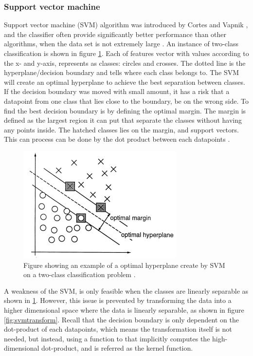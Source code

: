 \documentclass[USenglish]{ifimaster}  %
\begin{document}
\subsubsection{Support vector machine}
Support vector machine (SVM) algorithm was introduced by Cortes and Vapnik \cite{Cortes1995}, and the  classifier often provide significantly better performance than other algorithms, when the data set is not extremely large \cite{Marsland:2009:MLA:1571643}. An instance of two-class classification is shown in figure \ref{fig:SVM}. Each of features vector with values according to the x- and y-axis, represents as classes: circles and crosses. The dotted line is the hyperplane/decision boundary and tells where each class belongs to. The SVM will create an optimal hyperplane to achieve the best separation between classes. If the decision boundary was moved with small amount, it has a risk that a datapoint from one class that lies close to the boundary, be on the wrong side. To find the best decision boundary is by defining the optimal margin. The margin is defined as the largest region it can put that separate the classes without having any points inside. The hatched classes lies on the margin, and support vectors. This can process can be done by the dot product between each datapoints \cite{Cortes1995}.
	
\begin{figure}[h]
	\centering
	\includegraphics{Figures/SVM.PNG}
	\caption{Figure showing an example of a optimal hyperplane create by SVM on a two-class classification problem  \cite{Cortes1995}.}
	\label{fig:SVM}
\end{figure}
\FloatBarrier

A weakness of the SVM, is only feasible when the classes are linearly separable as shown in \ref{fig:SVM}. However, this issue is prevented by transforming the data into a higher dimensional space where the data is linearly separable, as shown in figure \ref{fig:svmtransform}. Recall that the decision boundary is only dependent on the dot-product of each datapoints, which means the transformation itself is not needed, but instead, using a function to that implicitly computes the high-dimensional dot-product, and is referred as the kernel function.
	
\end{document}
